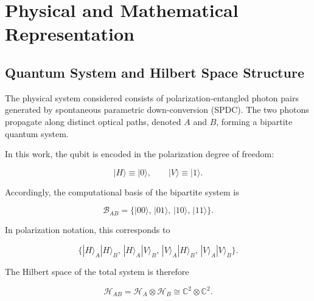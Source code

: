 
\chapter{Physical and Mathematical Representation}


\section{Quantum System and Hilbert Space Structure}

The physical system considered consists of polarization-entangled photon pairs generated by spontaneous parametric down-conversion (SPDC). The two photons propagate along distinct optical paths, denoted \( A \) and \( B \), forming a bipartite quantum system.

\medskip

In this work, the qubit is encoded in the polarization degree of freedom:

\begin{equation}
|H\rangle \equiv |0\rangle,
\qquad
|V\rangle \equiv |1\rangle.
\label{eq:polarization_computational_encoding}
\end{equation}

Accordingly, the computational basis of the bipartite system is

\begin{equation}
\mathcal{B}_{AB}
=
\{
|00\rangle,\,
|01\rangle,\,
|10\rangle,\,
|11\rangle
\}.
\label{eq:two_qubit_computational_basis}
\end{equation}

In polarization notation, this corresponds to

\[
\{
|H\rangle_A |H\rangle_B,\,
|H\rangle_A |V\rangle_B,\,
|V\rangle_A |H\rangle_B,\,
|V\rangle_A |V\rangle_B
\}.
\]

\medskip

The Hilbert space of the total system is therefore

\begin{equation}
\mathcal{H}_{AB}
=
\mathcal{H}_A \otimes \mathcal{H}_B
\cong
\mathbb{C}^{2} \otimes \mathbb{C}^{2}.
\label{eq:two_qubit_hilbert_space}
\end{equation}

